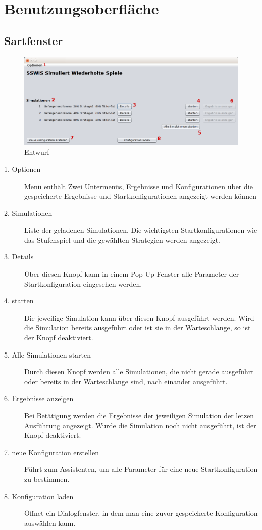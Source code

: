 \section{Benutzungsoberfläche}


\subsection{Sartfenster}

\begin{figure}[hp] 
  \centering
     \includegraphics[width=1.2\textwidth]{GUI_Entwurf/StartfensterBeispiel.png}
  \caption{Entwurf}
  \label{fig:Bild1}
\end{figure}

\begin{description}


\item[1. Optionen] Menü enthält Zwei Untermenüs, Ergebnisse und Konfigurationen über die gespeicherte Ergebnisse und Startkonfigurationen angezeigt werden können

\item[2. Simulationen] Liste der geladenen Simulationen. Die wichtigsten Startkonfigurationen wie das Stufenspiel und die gewählten Strategien werden angezeigt.

\item[3. Details] Über diesen Knopf kann in einem Pop-Up-Fenster alle Parameter der Startkonfiguration eingesehen werden.

\item[4. starten] Die jeweilige Simulation kann über diesen Knopf ausgeführt werden. Wird die Simulation bereits ausgeführt oder ist sie in der Warteschlange, so ist der Knopf deaktiviert.

\item[5. Alle Simulationen starten] Durch diesen Knopf werden alle Simulationen, die nicht gerade ausgeführt oder bereits in der Warteschlange sind, nach einander ausgeführt. 

\item[6. Ergebnisse anzeigen] Bei Betätigung werden die Ergebnisse der jeweiligen Simulation der letzen Ausführung angezeigt. Wurde die Simulation noch nicht ausgeführt, ist der Knopf deaktiviert.

\item[7. neue Konfiguration erstellen] Führt zum Assistenten, um alle Parameter für eine neue Startkonfiguration zu bestimmen.

\item[8. Konfiguration laden] Öffnet ein Dialogfenster, in dem man eine zuvor gespeicherte Konfiguration auswählen kann.

\end{description}



